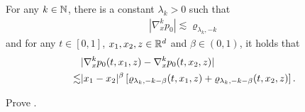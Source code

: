 \begin{lemma}\label{Lem:Dp0}
    For any \(k\in {\mathbb N}\), there is a constant \(\lambda_k>0\) such that 
    \begin{align*}
        |\nabla^k_{x}p_0|\lesssim \varrho_{\lambda_{k}, -k}
    \end{align*}
    and for any \(t\in [0,1]\), \(x_1,x_2,z\in {\mathbb R}^d\) and \(\beta\in (0,1) \), it holds that 
    \begin{equation*}
    \begin{aligned}
        &|\nabla^k_{x}p_0(t,x_1, z)-\nabla^k_{x}p_0(t,x_2, z)| \\
        \lesssim& |x_1-x_2|^{\beta} \left[\varrho_{\lambda_{k}, -k-\beta}(t,x_1,z)+\varrho_{\lambda_{k}, -k-\beta}(t,x_2,z)\right]. 
    \end{aligned}  
    \end{equation*}
\end{lemma}
\begin{exercise}
    Prove . 
\end{exercise}


